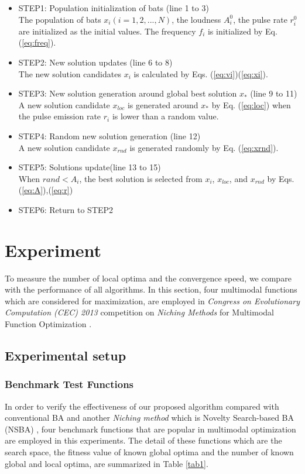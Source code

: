 \documentclass[conference]{IEEEtran}
\begin{document}
\begin{itemize}
\item STEP1: Population initialization of bats (line 1 to 3)\\
The population of bats ${x_i}(i=1, 2, ..., N)$, the loudness ${A_i^0}$, the pulse rate ${r_i^0}$ are initialized as the initial values. The frequency ${f_i}$ is initialized by Eq.(\ref{eq:freq}).
\item STEP2: New solution updates (line 6 to 8)\\
The new solution candidates ${x_i}$ is calculated by Eqs. (\ref{eq:vi})(\ref{eq:xi}).
\item STEP3: New solution generation around global best solution ${x_*}$ (line 9 to 11)\\
A new solution candidate $x_{loc}$ is generated around $x_*$ by Eq. (\ref{eq:loc}) when the pulse emission rate $r_i$ is lower than a random value.
\item STEP4: Random new solution generation (line 12)\\
A new solution candidate ${x_{rnd}}$ is generated randomly by Eq. (\ref{eq:xrnd}).  
\item STEP5: Solutions update(line 13 to 15)\\
When ${rand < A_i}$, the best solution is selected from $x_i$, ${x_{loc}}$, and ${x_{rnd}}$ by Eqs.(\ref{eq:A}),(\ref{eq:r})
\item STEP6: Return to STEP2 
\end{itemize}

\section{Experiment}
To measure the number of local optima and the convergence speed, we compare with the performance of all algorithms. In this section, four multimodal functions which are considered for maximization, are employed in \textit{Congress on Evolutionary Computation (CEC) 2013} competition on {\it Niching Methods} for
Multimodal Function Optimization \cite{cec2013}. 

\subsection{Experimental setup}
\subsubsection{Benchmark Test Functions}
In order to verify the effectiveness of our proposed algorithm compared with conventional BA and another {\it Niching method} which is Novelty Search-based BA (NSBA) \cite{NSBA}, four benchmark functions that are popular in multimodal optimization are employed in this experiments. The detail of these functions which are the search space, the fitness value of known global optima and the number of known global and local optima, are summarized in Table \ref{tab1}.
\end{document}
